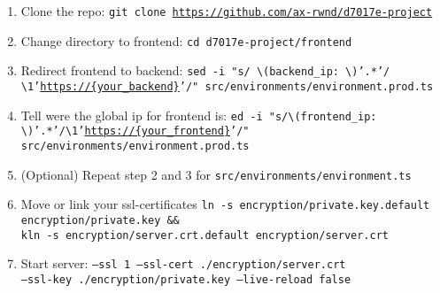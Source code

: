 \begin{enumerate}
    \item Clone the repo: \texttt{git clone \url{https://github.com/ax-rwnd/d7017e-project}}
    \item Change directory to frontend: \texttt{cd d7017e-project/frontend}
    \item Redirect frontend to backend: \texttt{sed -i "s/ \textbackslash (backend\_ip: \textbackslash )'.*'/ \\ \textbackslash 1'\url{https://{your\_backend}}'/" src/environments/environment.prod.ts}
    \item Tell were the global ip for frontend is: \texttt{ed -i "s/\textbackslash (frontend\_ip: \\ \textbackslash)'.*'/\textbackslash 1'\url{https://{your\_frontend}}'/" src/environments/environment.prod.ts}
    \item (Optional) Repeat step 2 and 3 for \texttt{src/environments/environment.ts}
    \item Move or link your ssl-certificates \texttt{ln -s encryption/private.key.default \\
    encryption/private.key \&\& \\
   kln -s encryption/server.crt.default encryption/server.crt}
    \item Start server: \texttt{--ssl 1 --ssl-cert ./encryption/server.crt \\
    --ssl-key ./encryption/private.key --live-reload false}
\end{enumerate}
